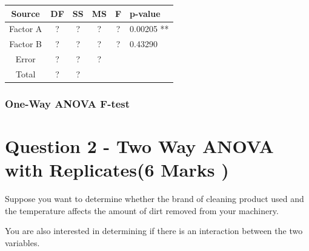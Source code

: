 \documentclass[a4paper,12pt]{article}
\begin{document}
	\begin{center}
		\begin{tabular}{|c||c|c|c|c|l|}
			\hline Source & DF & SS & MS & F & p-value \\ \hline 
			\hline Factor A & \phantom{mak} ? \phantom{mak}  & \phantom{mak} ? \phantom{mak}  & \phantom{mak} ? \phantom{mak}  & \phantom{mak} ? \phantom{mak}  &0.00205 ** \\ \hline
			\hline Factor B & \phantom{mak} ? \phantom{mak}  & \phantom{mak} ? \phantom{mak}  & \phantom{mak} ? \phantom{mak}  & \phantom{mak} ? \phantom{mak}  & 0.43290    \\ \hline
			\hline Error &  ? & ? & \phantom{mak} ? \phantom{mak}  &  &  \\ 
			\hline \hline Total & ? & ? &  &  &  \\ 
			\hline 
		\end{tabular}
	\end{center} 
	
	
	
	
	
	
	
	
	
	
	

\subsubsection*{One-Way ANOVA F-test}




	\section*{Question 2 - Two Way ANOVA with Replicates(6 Marks )}
	\noindent Suppose you want to determine whether the brand of cleaning product used and the temperature affects the amount of dirt removed from your machinery. 
	
	\noindent You are also interested in determining if there is an interaction between the two variables.
	
\end{document}
